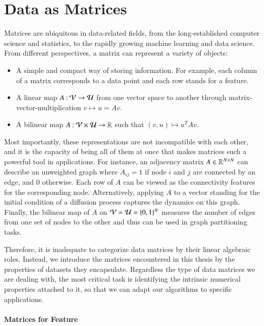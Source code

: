 \section{Data as Matrices}\label{pre:dam}

Matrices are ubiquitous in data\hyp{}related fields, from the 
long\hyp{}established computer science and statistics, to the rapidly growing
machine learning and data science. From different perspectives, a matrix can
represent a variety of objects:
\begin{itemize}
	\item A simple and compact way of storing information. For example, each
	column of a matrix corresponds to a data point and each row stands for a
	feature.
	\item A linear map $A\mathbin{:}\mathcal{V}\to\mathcal{U}$ from one vector space to another
	through matrix\hyp{}vector\hyp{}multiplication $v\mapsto u = Av$. 
	\item A bilinear map $A\mathbin{:}\mathcal{V}\times\mathcal{U}\to \mathbb{R}$ such that $(v,
	u)\mapsto u^TAv$.
\end{itemize}
Most importantly, these representations are not incompatible with each other,
and it is the capacity of being all of them at once that makes matrices such
a powerful tool in applications. For instance, an adjacency matrix $A\in\mathbb{R}^
{N\mathbin{\times} N}$ can describe an unweighted graph where $A_{ij} = 1$ if node $i$
and $j$ are connected by an edge, and $0$ otherwise. Each row of $A$ can be
viewed as the connectivity features for the corresponding node. Alternatively,
applying $A$ to a vector standing for the initial condition of a diffusion
process captures the dynamics on this graph. Finally, the bilinear map of $A$ on
$\mathcal{V} = \mathcal{U} = \{0, 1\}^N$ measures the number of edges from one set of nodes
to the other and thus can be used in graph partitioning tasks.

Therefore, it is inadequate to categorize data matrices by their linear
algebraic roles. Instead, we introduce the matrices encountered in this thesis
by the properties of datasets they encapsulate. Regardless the type of data
matrices we are dealing with, the most critical task is identifying the
intrinsic numerical properties attached to it, so that we can adapt our
algorithms to specific applications.

\paragraph{Matrices for Feature}

